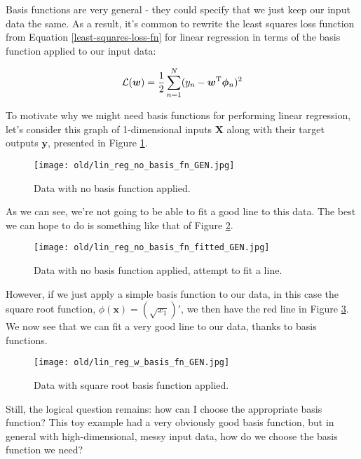 Basis functions are very general - they could specify that we just keep our input data the same. As a result, it's common to rewrite the least squares loss function from Equation \ref{least-squares-loss-fn} for linear regression in terms of the basis function applied to our input data:

\begin{equation} \label{least-squares-loss-fn-w-basis}
    \mathcal{L}(\bm{w}) = \frac{1}{2} \sum_{n=1}^{N} (y_n - \bm{w}^{\mathrm T}\boldsymbol{\phi}_n)^2
\end{equation}

To motivate why we might need basis functions for performing linear regression, let's consider this graph of 1-dimensional inputs $\bm{X}$ along with their target outputs $\bm{y}$, presented in Figure \ref{fig:lin-reg-no-basis-fn}.

\begin{figure}
    \centering
    \texttt{[image: old/lin\_reg\_no\_basis\_fn\_GEN.jpg]}
    \caption{Data with no basis function applied.}
    \label{fig:lin-reg-no-basis-fn}
\end{figure}

As we can see, we're not going to be able to fit a good line to this data. The best we can hope to do is something like that of Figure \ref{fig:lin-reg-no-basis-fn-fitted}.

\begin{figure}
    \centering
    \texttt{[image: old/lin\_reg\_no\_basis\_fn\_fitted\_GEN.jpg]}
    \caption{Data with no basis function applied, attempt to fit a line.}
    \label{fig:lin-reg-no-basis-fn-fitted}
\end{figure}

However, if we just apply a simple basis function to our data, in this case the square root function, $\phi(\bm{x}) = (\sqrt{x_1})'$, we then have the red line in Figure \ref{fig:lin-reg-w-basis-fn-fitted}. We now see that we can fit a very good line to our data, thanks to basis functions.

\begin{figure}
    \centering
    \texttt{[image: old/lin\_reg\_w\_basis\_fn\_GEN.jpg]}
    \caption{Data with square root basis function applied.}
    \label{fig:lin-reg-w-basis-fn-fitted}
\end{figure}

Still, the logical question remains: how can I choose the appropriate basis function? This toy example had a very obviously good basis function, but in general with high-dimensional, messy input data, how do we choose the basis function we need?


